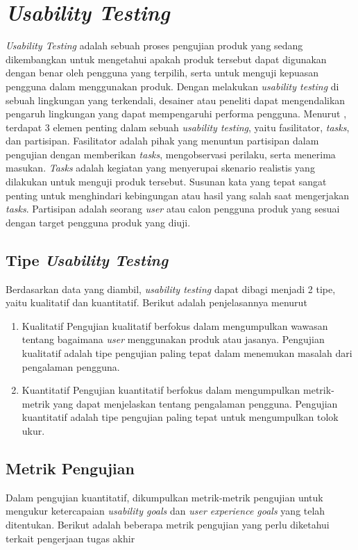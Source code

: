 \section{\textit{Usability Testing}}
\textit{Usability Testing} adalah sebuah proses pengujian produk yang sedang dikembangkan untuk mengetahui apakah produk tersebut dapat digunakan dengan benar oleh pengguna yang terpilih, serta untuk menguji kepuasan pengguna dalam menggunakan produk. Dengan melakukan \textit{usability testing} di sebuah lingkungan yang terkendali, desainer atau peneliti dapat mengendalikan pengaruh lingkungan yang dapat mempengaruhi performa pengguna. \parencite{PreeceRogersSharp15} Menurut \textcite{nielsengrouptesting}, terdapat 3 elemen penting dalam sebuah \textit{usability testing}, yaitu fasilitator, \textit{tasks}, dan partisipan. Fasilitator adalah pihak yang menuntun partisipan dalam pengujian dengan memberikan \textit{tasks}, mengobservasi perilaku, serta menerima masukan. \textit{Tasks} adalah kegiatan yang menyerupai skenario realistis yang dilakukan untuk menguji produk tersebut. Susunan kata yang tepat sangat penting untuk menghindari kebingungan atau hasil yang salah saat mengerjakan \textit{tasks}. Partisipan adalah seorang \textit{user} atau calon pengguna produk yang sesuai dengan target pengguna produk yang diuji. 

\subsection{Tipe \textit{Usability Testing}}
Berdasarkan data yang diambil, \textit{usability testing} dapat dibagi menjadi 2 tipe, yaitu kualitatif dan kuantitatif. Berikut adalah penjelasannya menurut \textcite{nielsengrouptesting}

\begin{enumerate}
  \item Kualitatif
  \subitem Pengujian kualitatif berfokus dalam mengumpulkan wawasan tentang bagaimana \textit{user} menggunakan produk atau jasanya. Pengujian kualitatif adalah tipe pengujian paling tepat dalam menemukan masalah dari pengalaman pengguna.

  \item Kuantitatif
  \subitem Pengujian kuantitatif berfokus dalam mengumpulkan metrik-metrik yang dapat menjelaskan tentang pengalaman pengguna. Pengujian kuantitatif adalah tipe pengujian paling tepat untuk mengumpulkan tolok ukur. 
\end{enumerate}


\subsection{Metrik Pengujian}
Dalam pengujian kuantitatif, dikumpulkan metrik-metrik pengujian untuk mengukur ketercapaian \textit{usability goals} dan \textit{user experience goals} yang telah ditentukan. Berikut adalah beberapa metrik pengujian yang perlu diketahui terkait pengerjaan tugas akhir


